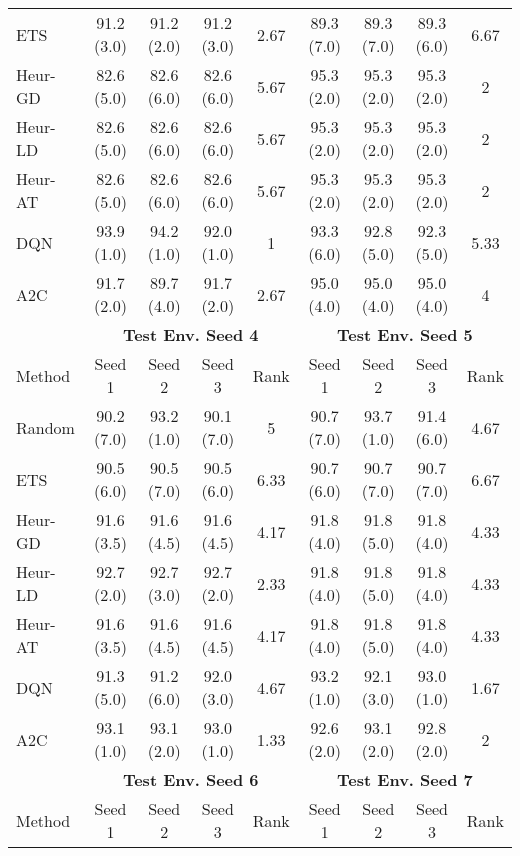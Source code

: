 \begin{table}[t]
{\begin{tabular}{lcccccccc}
ETS       & 91.2 (3.0)  & 91.2 (2.0)  & 91.2 (3.0) & 2.67 & 89.3 (7.0)  & 89.3 (7.0)  & 89.3 (6.0) & 6.67 \\
Heur-GD   & 82.6 (5.0)  & 82.6 (6.0)  & 82.6 (6.0) & 5.67 & 95.3 (2.0)  & 95.3 (2.0)  & 95.3 (2.0) & 2    \\
Heur-LD   & 82.6 (5.0)  & 82.6 (6.0)  & 82.6 (6.0) & 5.67 & 95.3 (2.0)  & 95.3 (2.0)  & 95.3 (2.0) & 2    \\
Heur-AT   & 82.6 (5.0)  & 82.6 (6.0)  & 82.6 (6.0) & 5.67 & 95.3 (2.0)  & 95.3 (2.0)  & 95.3 (2.0) & 2    \\
DQN       & 93.9 (1.0)  & 94.2 (1.0)  & 92.0 (1.0) & 1    & 93.3 (6.0)  & 92.8 (5.0)  & 92.3 (5.0) & 5.33 \\
A2C       & 91.7 (2.0)  & 89.7 (4.0)  & 91.7 (2.0) & 2.67 & 95.0 (4.0)  & 95.0 (4.0)  & 95.0 (4.0) & 4    \\ \midrule
\textbf{} & \multicolumn{4}{c}{\textbf{Test Env. Seed 4}} & \multicolumn{4}{c}{\textbf{Test Env. Seed 5}} \\
\cmidrule(lr){2-5} \cmidrule(lr){6-9} 
Method    & Seed 1      & Seed 2      & Seed 3     & Rank & Seed 1      & Seed 2      & Seed 3     & Rank \\ \midrule
Random    & 90.2 (7.0)  & 93.2 (1.0)  & 90.1 (7.0) & 5    & 90.7 (7.0)  & 93.7 (1.0)  & 91.4 (6.0) & 4.67 \\
ETS       & 90.5 (6.0)  & 90.5 (7.0)  & 90.5 (6.0) & 6.33 & 90.7 (6.0)  & 90.7 (7.0)  & 90.7 (7.0) & 6.67 \\
Heur-GD   & 91.6 (3.5)  & 91.6 (4.5)  & 91.6 (4.5) & 4.17 & 91.8 (4.0)  & 91.8 (5.0)  & 91.8 (4.0) & 4.33 \\
Heur-LD   & 92.7 (2.0)  & 92.7 (3.0)  & 92.7 (2.0) & 2.33 & 91.8 (4.0)  & 91.8 (5.0)  & 91.8 (4.0) & 4.33 \\
Heur-AT   & 91.6 (3.5)  & 91.6 (4.5)  & 91.6 (4.5) & 4.17 & 91.8 (4.0)  & 91.8 (5.0)  & 91.8 (4.0) & 4.33 \\
DQN       & 91.3 (5.0)  & 91.2 (6.0)  & 92.0 (3.0) & 4.67 & 93.2 (1.0)  & 92.1 (3.0)  & 93.0 (1.0) & 1.67 \\
A2C       & 93.1 (1.0)  & 93.1 (2.0)  & 93.0 (1.0) & 1.33 & 92.6 (2.0)  & 93.1 (2.0)  & 92.8 (2.0) & 2    \\ \midrule
\textbf{} & \multicolumn{4}{c}{\textbf{Test Env. Seed 6}} & \multicolumn{4}{c}{\textbf{Test Env. Seed 7}} \\
\cmidrule(lr){2-5} \cmidrule(lr){6-9} 
Method    & Seed 1      & Seed 2      & Seed 3     & Rank & Seed 1      & Seed 2      & Seed 3     & Rank \\ \midrule

\end{tabular}}
\end{table}
